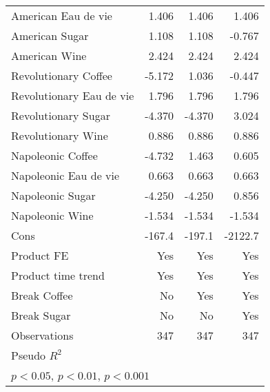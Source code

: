 \begin{table}[htbp]
\begin{tabular}{l*{3}{D{.}{.}{-1}}}
American Eau de vie &       1.406\sym{**} &       1.406\sym{**} &       1.406\sym{**} \\
American Sugar      &       1.108\sym{*}  &       1.108\sym{*}  &      -0.767\sym{*}  \\
American Wine       &       2.424\sym{***}&       2.424\sym{***}&       2.424\sym{***}\\
Revolutionary Coffee&      -5.172\sym{*}  &       1.036         &      -0.447         \\
Revolutionary Eau de vie&       1.796\sym{***}&       1.796\sym{***}&       1.796\sym{***}\\
Revolutionary Sugar &      -4.370\sym{**} &      -4.370\sym{**} &       3.024         \\
Revolutionary Wine  &       0.886         &       0.886         &       0.886         \\
Napoleonic Coffee   &      -4.732         &       1.463         &       0.605         \\
Napoleonic Eau de vie&       0.663         &       0.663         &       0.663         \\
Napoleonic Sugar    &      -4.250\sym{**} &      -4.250\sym{**} &       0.856         \\
Napoleonic Wine     &      -1.534         &      -1.534         &      -1.534         \\
Cons                &      -167.4         &      -197.1         &     -2122.7\sym{***}\\
Product FE          &         Yes         &         Yes         &         Yes         \\
Product time trend  &         Yes         &         Yes         &         Yes         \\
Break Coffee        &          No         &         Yes         &         Yes         \\
Break Sugar         &          No         &          No         &         Yes         \\
\hline
Observations        &         347         &         347         &         347         \\
Pseudo \(R^{2}\)    &                     &                     &                     \\
\hline\hline
{}\\
\end{tabular}
\end{table}
